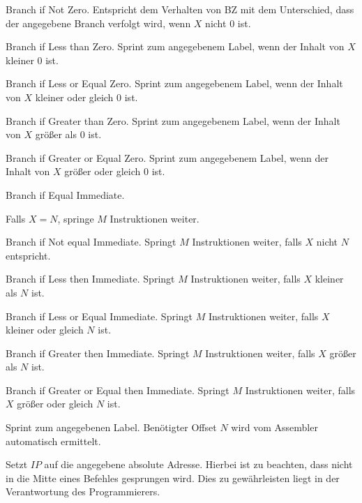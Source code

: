 \glqq Branch if Not Zero\grqq. Entspricht dem Verhalten von BZ mit dem
Unterschied, dass der angegebene Branch verfolgt wird, wenn $X$ nicht $0$ ist.


\glqq Branch if Less than Zero\grqq. 
Sprint zum angegebenem Label, wenn der Inhalt von $X$ kleiner $0$ ist.

\glqq Branch if Less or Equal Zero\grqq.
Sprint zum angegebenem Label, wenn der Inhalt von $X$ kleiner oder gleich $0$
ist.


\glqq Branch if Greater than Zero\grqq.
Sprint zum angegebenem Label, wenn der Inhalt von $X$ größer als $0$ ist.


\glqq Branch if Greater or Equal Zero\grqq. 
Sprint zum angegebenem Label, wenn der Inhalt von $X$ größer oder gleich $0$
ist.




\glqq Branch if Equal Immediate\grqq.

Falls $X = N$, springe $M$ Instruktionen weiter.



\glqq Branch if Not equal Immediate\grqq.
Springt $M$ Instruktionen weiter, falls $X$ nicht $N$ entspricht.


\glqq Branch if Less then Immediate\grqq.
Springt $M$ Instruktionen weiter, falls $X$ kleiner als $N$ ist.


\glqq Branch if Less or Equal Immediate\grqq.
Springt $M$ Instruktionen weiter, falls $X$ kleiner oder gleich $N$ ist.


\glqq Branch if Greater then Immediate\grqq.
Springt $M$ Instruktionen weiter, falls $X$ größer als $N$ ist.

\glqq Branch if Greater or Equal then Immediate\grqq.
Springt $M$ Instruktionen weiter, falls $X$ größer oder gleich $N$ ist.



Sprint zum angegebenen Label. Benötigter Offset $N$ wird vom Assembler
automatisch ermittelt.



Setzt $IP$ auf die angegebene absolute Adresse. Hierbei ist zu beachten, dass
nicht in die Mitte eines Befehles gesprungen wird. Dies zu gewährleisten liegt
in der Verantwortung des Programmierers.

